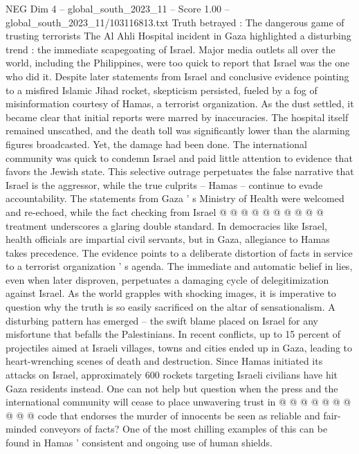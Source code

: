 \begin{textsample}{NEG Dim 4 – global\_south\_2023\_11 – Score 1.00 – global\_south\_2023\_11/103116813.txt}  \label{ex:f4_neg_293}
Truth betrayed : The dangerous game of trusting terrorists The Al Ahli Hospital incident in Gaza highlighted a disturbing trend : the immediate scapegoating of Israel.
Major media outlets all over the world, including the Philippines, were too quick to report that Israel was the one who did it.
Despite later statements from Israel and conclusive evidence pointing to a misfired Islamic Jihad rocket, skepticism persisted, fueled by a fog of misinformation courtesy of Hamas, a terrorist organization.
As the dust settled, it became clear that initial reports were marred by inaccuracies.
The hospital itself remained unscathed, and the death toll was significantly lower than the alarming figures broadcasted.
Yet, the damage had been done.
The international community was quick to condemn Israel and paid little attention to evidence that favors the Jewish state.
This selective outrage perpetuates the false narrative that Israel is the aggressor, while the true culprits -- Hamas -- continue to evade accountability.
The statements from Gaza ' s Ministry of Health were welcomed and re-echoed, while the fact checking from Israel @ @ @ @ @ @ @ @ @ @ treatment underscores a glaring double standard.
In democracies like Israel, health officials are impartial civil servants, but in Gaza, allegiance to Hamas takes precedence.
The evidence points to a deliberate distortion of facts in service to a terrorist organization ' s agenda.
The immediate and automatic belief in lies, even when later disproven, perpetuates a damaging cycle of delegitimization against Israel.
As the world grapples with shocking images, it is imperative to question why the truth is so easily sacrificed on the altar of sensationalism.
A disturbing pattern has emerged -- the swift blame placed on Israel for any misfortune that befalls the Palestinians.
In recent conflicts, up to 15 percent of projectiles aimed at Israeli villages, towns and cities ended up in Gaza, leading to heart-wrenching scenes of death and destruction.
Since Hamas initiated its attacks on Israel, approximately 600 rockets targeting Israeli civilians have hit Gaza residents instead.
One can not help but question when the press and the international community will cease to place unwavering trust in @ @ @ @ @ @ @ @ @ @ code that endorses the murder of innocents be seen as reliable and fair-minded conveyors of facts?
One of the most chilling examples of this can be found in Hamas ' consistent and ongoing use of human shields.

\end{textsample}
